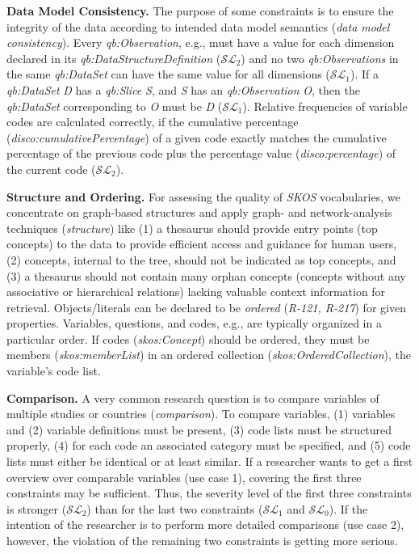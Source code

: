 \documentclass{llncs}
\begin{document}

\textbf{Data Model Consistency.}
The purpose of some constraints is to ensure the integrity of
the data according to intended data model semantics (\emph{data model consistency}).
Every \emph{qb:Observation}, e.g., must have a value for each dimension
declared in its \emph{qb:DataStructureDefinition} ($\mathcal{SL}_{2}$)
and no two \emph{qb:Observations} in the same \emph{qb:DataSet}
can have the same value for all dimensions ($\mathcal{SL}_{1}$).
If a \emph{qb:DataSet} \emph{D} has a \emph{qb:Slice} \emph{S}, and \emph{S} has an
\emph{qb:Observation} \emph{O}, then the \emph{qb:DataSet} corresponding to \emph{O} must be \emph{D} ($\mathcal{SL}_{1}$).
Relative frequencies of variable codes are calculated correctly, if the cumulative percentage (\emph{disco:cumulativePercentage}) of a given code exactly matches the cumulative percentage of the previous code
plus the percentage value (\emph{disco:percentage}) of the current code ($\mathcal{SL}_{2}$).

\textbf{Structure and Ordering.}
For assessing the quality of \emph{SKOS} vocabularies, we concentrate on graph-based structures and apply graph- and network-analysis techniques (\emph{structure}) like 
(1) a thesaurus should provide entry points (top concepts) to the data to provide efficient access and guidance for human users,
(2) concepts, internal to the tree, should not be indicated as top concepts, and
(3) a thesaurus should not contain many orphan concepts 
(concepts without any associative or hierarchical relations) lacking valuable context information for retrieval.
Objects/literals can be declared to be \emph{ordered} (\emph{R-121, R-217}) for given properties.
Variables, questions, and codes, e.g., are typically organized in a particular order. 
If codes (\emph{skos:Concept}) should be ordered, they must be members (\emph{skos:memberList}) in an ordered collection (\emph{skos:OrderedCollection}), the variable's code list.

\textbf{Comparison.}
A very common research question is to compare variables of multiple studies or countries (\emph{comparison}).
To compare variables, 
(1) variables and (2) variable definitions must be present,
(3) code lists must be structured properly,
(4) for each code an associated category must be specified, and
(5) code lists must either be identical or at least similar.
If a researcher wants to get a first overview over comparable variables (use case 1), 
covering the first three constraints may be sufficient.
Thus, the severity level of the first three constraints is stronger ($\mathcal{SL}_{2}$) than for the last two constraints ($\mathcal{SL}_{1}$ and $\mathcal{SL}_{0}$).
If the intention of the researcher is to perform more detailed comparisons (use case 2), however, the violation of the remaining two constraints is getting more serious.
\end{document}
